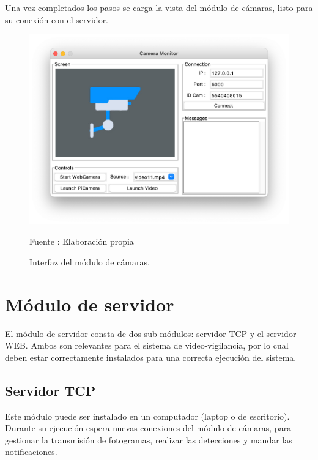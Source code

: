 Una vez completados los pasos se carga la vista del módulo de cámaras, listo para su conexión con el servidor.

\begin{figure}[H]
    \begin{center}
        \includegraphics[width=13cm]{img/anexos/mod_camera.png}
        \caption{Interfaz del módulo de cámaras.}
        Fuente : Elaboración propia
    \end{center}
\end{figure}

\section*{Módulo de servidor}
El módulo de servidor consta de dos sub-módulos: servidor-TCP y el servidor-WEB. Ambos son relevantes para el sistema de video-vigilancia, por lo cual deben estar correctamente instalados para una correcta ejecución del sistema.
\subsection*{Servidor TCP}
Este módulo puede ser instalado en un computador (laptop o de escritorio). Durante su ejecución espera nuevas conexiones del módulo de cámaras, para gestionar la transmisión de fotogramas, realizar las detecciones y mandar las notificaciones.\\

